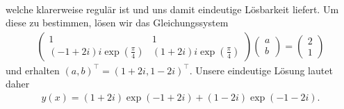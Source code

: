 \begin{solution}
\begin{enumerate}[label = \textbf{\alph*)}]
\begin{align*}
  \end{align*}
  welche klarerweise regulär ist und uns damit eindeutige Lösbarkeit liefert.
  Um diese zu bestimmen, lösen wir das Gleichungssystem
  \begin{align*}
    \begin{pmatrix}
      1 & 1\\
      (-1 + 2i)i\exp(\frac{\pi}{4}) & (1 + 2i)i\exp(\frac{\pi}{4})
    \end{pmatrix}
    \begin{pmatrix}
      a \\ b
    \end{pmatrix} =
    \begin{pmatrix}
      2 \\ 1
    \end{pmatrix}
  \end{align*}
  und erhalten $(a,b)^{\top} = (1+2i,1-2i)^{\top}$. Unsere eindeutige Lösung lautet daher
  \begin{align*}
    y(x) = (1+2i)\exp(-1 + 2i) + (1-2i)\exp(-1-2i).
  \end{align*}
\end{enumerate}
\end{solution}
